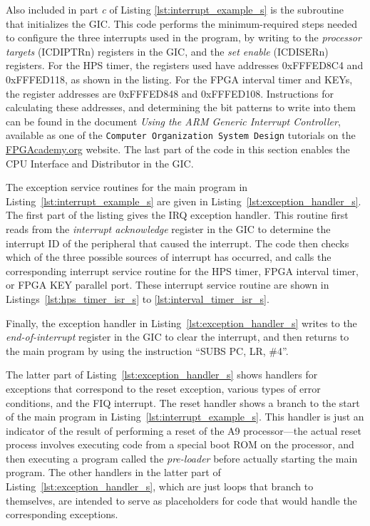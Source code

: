 Also included in part {\it c} of Listing \ref{lst:interrupt_example_s} is the subroutine that initializes the GIC.
This code performs the minimum-required steps needed to configure the three interrupts used 
in the program, by writing to the {\it processor targets} (ICDIPTRn) registers in the GIC, and 
the {\it set enable} (ICDISERn) registers. For the HPS timer, the registers used have
addresses {\sf 0xFFFED8C4} and {\sf 0xFFFED118}, as shown in the listing. For the FPGA
interval timer and KEYs, the register addresses are {\sf 0xFFFED848} and {\sf 0xFFFED108}.
Instructions for calculating these addresses, and determining the bit patterns to write
into them can be found in the document {\it Using the ARM Generic Interrupt Controller}, available
as one of the \texttt{Computer Organization System Design} tutorials on the
\href{https://www.fpgacademy.org/tutorials.html} {FPGAcademy.org} website.
The last part of the code in 
this section enables the CPU Interface and Distributor in the GIC.

The exception service routines for the main program in Listing~\ref{lst:interrupt_example_s} 
are given in Listing~\ref{lst:exception_handler_s}. 
The first part of the listing gives the IRQ exception handler. This routine first reads
from the {\it interrupt acknowledge} register in the GIC to determine the interrupt ID
of the peripheral that caused the interrupt. The code then checks which of the 
three possible sources of interrupt has occurred, and calls the corresponding interrupt 
service routine for the HPS timer, FPGA interval timer, or FPGA KEY parallel port.  
These interrupt service routine are shown in Listings~\ref{lst:hps_timer_isr_s}
to \ref{lst:interval_timer_isr_s}.

Finally, the exception handler in Listing~\ref{lst:exception_handler_s} writes to 
the {\it end-of-interrupt} register in the GIC to clear the interrupt, and then returns 
to the main program by using the instruction ``SUBS PC, LR, \#4''.

The latter part of Listing~\ref{lst:exception_handler_s} shows handlers for exceptions that correspond to 
the reset exception, various types of error conditions, and the FIQ interrupt.
The reset handler shows a branch to the start of the main program in 
Listing~\ref{lst:interrupt_example_s}. This handler is just an indicator of the
result of performing a reset of the A9 processor---the actual reset process involves
executing code from a special boot ROM on the processor, and then executing a program
called the {\it pre-loader} before actually starting the main program. 
The other handlers in the latter part of Listing~\ref{lst:exception_handler_s}, which are just 
loops that branch to themselves, are intended to serve as placeholders for code that would 
handle the corresponding exceptions.

